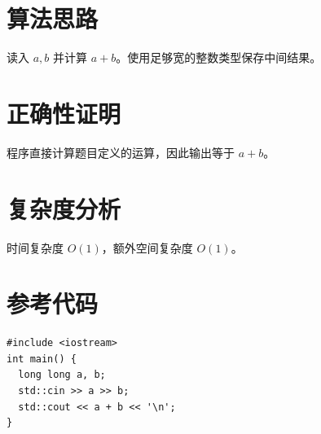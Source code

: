 \section*{算法思路}
读入 $a,b$ 并计算 $a+b$。使用足够宽的整数类型保存中间结果。
\section*{正确性证明}
程序直接计算题目定义的运算，因此输出等于 $a+b$。
\section*{复杂度分析}
时间复杂度 $O(1)$，额外空间复杂度 $O(1)$。
\section*{参考代码}
\begin{verbatim}
#include <iostream>
int main() {
  long long a, b;
  std::cin >> a >> b;
  std::cout << a + b << '\n';
}
\end{verbatim}
